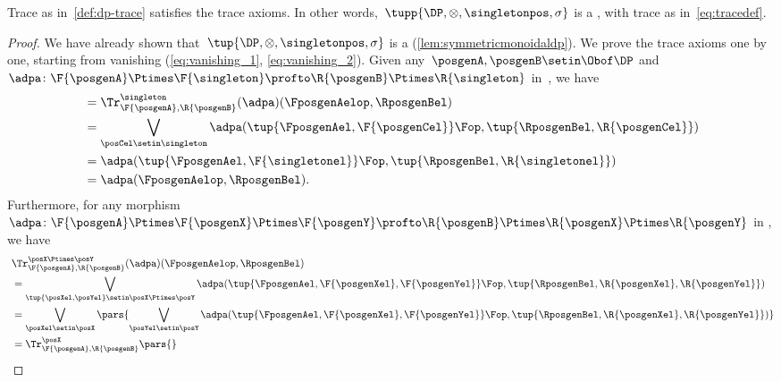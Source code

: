    \begin{lemma}\label{lem:dp-trace-is-trace}
        Trace as in~\cref{def:dp-trace} satisfies the trace axioms.
        In other words,~$\tupp{\DP, {{\otimes}}, \singletonpos, \sigma}$ is a , with trace as in~\cref{eq:tracedef}.
    \end{lemma}
    \begin{proof}
        We have already shown that~$\tup{\DP,{{\otimes}},\singletonpos,\sigma}$ is a  (\cref{lem:symmetricmonoidaldp}).
        We prove the trace axioms one by one, starting from vanishing (\cref{eq:vanishing_1}, \cref{eq:vanishing_2}).
        Given any~$\posgenA,\posgenB\setin \Obof\DP$ and~$\adpa\colon \F{\posgenA}\Ptimes \F{\singleton}\profto \R{\posgenB}\Ptimes \R{\singleton}$ in~\DP, we have
        \begin{equation}
            \begin{aligned}
                 & = \Tr_{\F{\posgenA},\R{\posgenB}}^{\singleton}(\adpa)(\FposgenAelop,\RposgenBel) \\
                 & =\bigvee_{\posCel\setin \singleton}\adpa(\tup{\FposgenAel,\F{\posgenCel}}\Fop, \tup{\RposgenBel,\R{\posgenCel}}) \\
                 & =\adpa(\tup{\FposgenAel,\F{\singletonel}}\Fop, \tup{\RposgenBel,\R{\singletonel}}) \\
                 & =\adpa(\FposgenAelop,\RposgenBel).
            \end{aligned}
        \end{equation}
        Furthermore, for any morphism~$\adpa\colon \F{\posgenA}\Ptimes \F{\posgenX}\Ptimes \F{\posgenY} \profto \R{\posgenB}\Ptimes \R{\posgenX} \Ptimes \R{\posgenY}$ in \DP, we have
        \begin{equation}
            \begin{aligned}
                ~ & \Tr_{\F{\posgenA},\R{\posgenB}}^{\posX\Ptimes\posY}(\adpa)(\FposgenAelop,\RposgenBel) \\
                  & = \bigvee_{\tup{\posXel,\posYel} \setin \posX\Ptimes \posY} \adpa(\tup{\FposgenAel,\F{\posgenXel},\F{\posgenYel}}\Fop, \tup{\RposgenBel,\R{\posgenXel},\R{\posgenYel}}) \\
                  & =\bigvee_{\posXel \setin \posX}\pars{\bigvee_{\posYel \setin \posY} \adpa(\tup{\FposgenAel,\F{\posgenXel},\F{\posgenYel}}\Fop, \tup{\RposgenBel,\R{\posgenXel},\R{\posgenYel}})} \\
                  & =\Tr_{\F{\posgenA},\R{\posgenB}}^\posX\pars{
}
\end{aligned}
\end{equation}
\end{proof}
